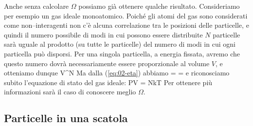 Anche senza calcolare $\Omega$ possiamo già ottenere qualche risultato. Consideriamo per esempio un gas ideale monoatomico. Poiché gli atomi del gas sono considerati come non--interagenti non c'è alcuna correlazione tra le posizioni delle particelle, e quindi il numero possibile di modi in cui possono essere distribuite $N$ particelle sarà uguale al prodotto (su tutte le particelle) del numero di modi in cui ogni particella può disporsi. Per una singola particella, a energia fissata, avremo che questo numero dovrà necessariamente essere proporzionale al volume $V$, e otteniamo dunque
\be
\Omega \propto V^{N}
\ee
Ma dalla (\ref{eq:02-eta}) abbiamo
\be
{} =  = 
\ee
e riconosciamo subito l'equazione di stato del gas ideale:
\be
PV = NkT
\ee
Per ottenere più informazioni sarà il caso di conoscere meglio $\Omega$.

\subsection{Particelle in una scatola}

